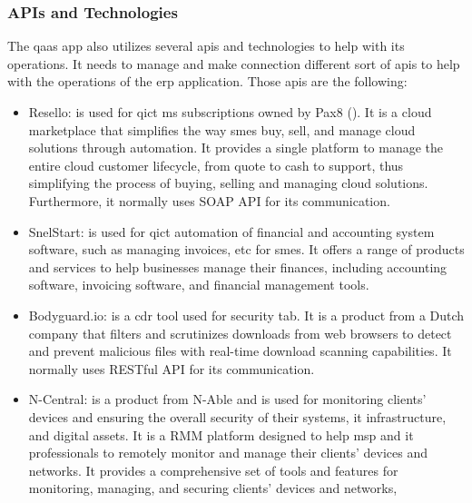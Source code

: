 \begin{multicols}{2}
      \subsubsection{APIs and Technologies}
      The \acrshort{qaas} app also utilizes several \acrshort{api}s and technologies to help with its operations.
      It needs to manage and make connection different sort of \acrshort{api}s to help with the operations of the
      \acrshort{erp} application. Those \acrshort{api}s are the following:
      \begin{itemize}
            \item Resello: is used for \acrshort{qict} \acrshort{ms} subscriptions owned by Pax8 (\textit{\cite{resello}}).
                  It is a cloud marketplace that simplifies the way \acrshort{sme}s buy, sell, and manage cloud solutions
                  through automation. It provides a single platform to manage the entire cloud customer lifecycle, from
                  quote to cash to support, thus simplifying the process of buying, selling and managing cloud
                  solutions. Furthermore, it normally uses \gls{SOAP API} for its communication.
            \item SnelStart: is used for \acrshort{qict} automation of financial and accounting system software,
                  such as managing invoices, \acrshort{etc} for \acrshort{sme}s. It offers a range of products and
                  services to help businesses manage their finances, including accounting software, invoicing software,
                  and financial management tools.
            \item Bodyguard.io: is a \acrshort{cdr} tool used for security tab. It is a product from a Dutch company
                  that filters and scrutinizes downloads from web browsers to detect and prevent malicious files with
                  real-time download scanning capabilities. It normally uses \gls{RESTful API} for its
                  communication.
            \item N-Central: is a product from N-Able and is used for monitoring clients' devices and ensuring the
                  overall security of their systems, \acrshort{it} infrastructure, and digital assets. It is a
                  \gls{RMM} platform designed to help \acrshort{msp} and \acrshort{it} professionals to
                  remotely monitor and manage their clients' devices and networks. It provides a comprehensive
                  set of tools and features for monitoring, managing, and securing clients' devices and networks,

\end{itemize}
\end{multicols}
